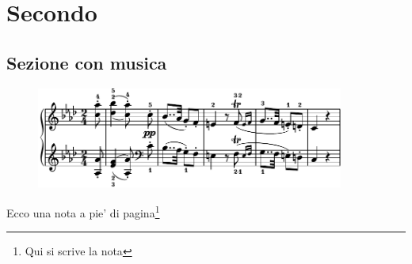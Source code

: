 \chapter{Secondo}
\pagestyle{fancy}




\lipsum[10-12]

\section{Sezione con musica}

\lipsum[13]




\begin{figure}[h]
   \centering 
 \includegraphics[width=0.9\textwidth]{img/piano.pdf}
\end{figure}



Ecco una nota a pie' di pagina\footnote{Qui si scrive la nota}

